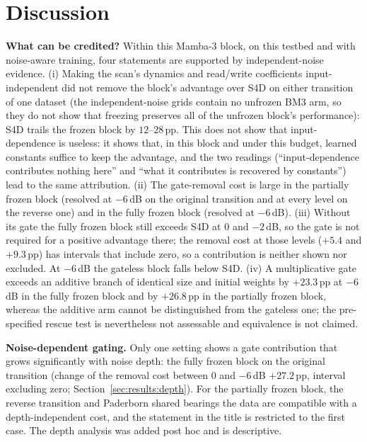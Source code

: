 \section{Discussion}
\label{sec:discussion}

\textbf{What can be credited?} Within this Mamba-3 block, on this testbed and with noise-aware training, four statements are supported by independent-noise evidence. (i) Making the scan's dynamics and read/write coefficients input-independent did not remove the block's advantage over S4D on either transition of one dataset (the independent-noise grids contain no unfrozen BM3 arm, so they do not show that freezing preserves all of the unfrozen block's performance): S4D trails the frozen block by $12$--$28$\,pp. This does not show that input-dependence is useless: it shows that, in this block and under this budget, learned constants suffice to keep the advantage, and the two readings (``input-dependence contributes nothing here'' and ``what it contributes is recovered by constants'') lead to the same attribution. (ii) The gate-removal cost is large in the partially frozen block (resolved at $-6$\,dB on the original transition and at every level on the reverse one) and in the fully frozen block (resolved at $-6$\,dB). (iii) Without its gate the fully frozen block still exceeds S4D at $0$ and $-2$\,dB, so the gate is not required for a positive advantage there; the removal cost at those levels ($+5.4$ and $+9.3$\,pp) has intervals that include zero, so a contribution is neither shown nor excluded. At $-6$\,dB the gateless block falls below S4D. (iv) A multiplicative gate exceeds an additive branch of identical size and initial weights by $+23.3$\,pp at $-6$\,dB in the fully frozen block and by $+26.8$\,pp in the partially frozen block, whereas the additive arm cannot be distinguished from the gateless one; the pre-specified rescue test is nevertheless not assessable and equivalence is not claimed.

\textbf{Noise-dependent gating.} Only one setting shows a gate contribution that grows significantly with noise depth: the fully frozen block on the original transition (change of the removal cost between $0$ and $-6$\,dB $+27.2$\,pp, interval excluding zero; Section~\ref{sec:results:depth}). For the partially frozen block, the reverse transition and Paderborn shared bearings the data are compatible with a depth-independent cost, and the statement in the title is restricted to the first case. The depth analysis was added post hoc and is descriptive.

